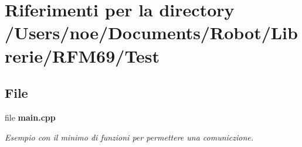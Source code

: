 \section{Riferimenti per la directory /\+Users/noe/\+Documents/\+Robot/\+Librerie/\+R\+F\+M69/\+Test}
\label{dir_37618a71d99bdfed5979e976980d5eec}
\subsection*{File}
\begin{DoxyCompactItemize}
\item 
file \textbf{ main.\+cpp}
\begin{DoxyCompactList}\small\item\em Esempio con il minimo di funzioni per permettere una comuniczione. \end{DoxyCompactList}\end{DoxyCompactItemize}

